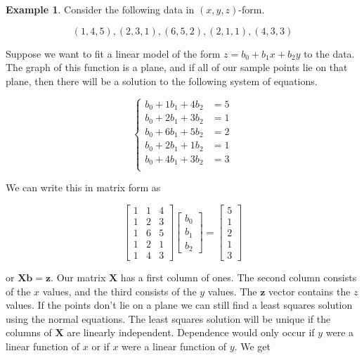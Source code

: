 \documentclass[
]{book}
\theoremstyle{definition}
\theoremstyle{definition}
\newtheorem{example}{Example}[chapter]
\theoremstyle{definition}
\theoremstyle{definition}
\theoremstyle{remark}
\begin{document}
\begin{examplebox}

\begin{example}
\protect\hypertarget{exm:multilin}{}\label{exm:multilin}Consider the following data in \((x,y,z)\)-form.

\[(1,4,5),(2,3,1),(6,5,2),(2,1,1),(4,3,3)\]

Suppose we want to fit a linear model of the form \(z=b_0+b_1x+b_2y\) to the data. The graph of this function is a plane, and if all of our sample points lie on that plane, then there will be a solution to the following system of equations.

\begin{equation*}
\left\{ \begin{array}{rcl}
b_0+1b_1+4b_2&=5\\
b_0+2b_1+3b_2&=1\\
b_0+6b_1+5b_2&=2\\
b_0+2b_1+1b_2&=1\\
b_0+4b_1+3b_2&=3\\
\end{array}
\right.
\end{equation*}

We can write this in matrix form as

\[\begin{bmatrix} 1 & 1 & 4\\1 & 2 & 3\\1 & 6 & 5\\1 & 2 & 1\\1 & 4 & 3\end{bmatrix}\begin{bmatrix} b_0\\b_1\\b_2\end{bmatrix}=\begin{bmatrix}5\\1\\2\\1\\3\end{bmatrix}\]

or \(\mathbf{X}\mathbf{b}=\mathbf{z}.\) Our matrix \(\mathbf{X}\) has a first column of ones. The second column consists of the \(x\) values, and the third consists of the \(y\) values. The \(\mathbf{z}\) vector contains the \(z\) values. If the points don't lie on a plane we can still find a least squares solution using the normal equations. The least squares solution will be unique if the columns of \(\mathbf{X}\) are linearly independent. Dependence would only occur if \(y\) were a linear function of \(x\) or if \(x\) were a linear function of \(y\). We get


\end{example}
\end{examplebox}
\end{document}
